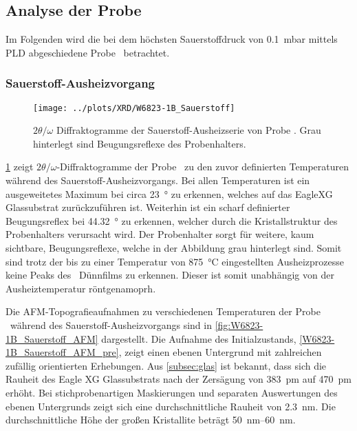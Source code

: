 
\newpage

\subsection{Analyse der Probe \samplethree}\label{subsec:probe-W6823-1}
Im Folgenden wird die bei dem höchsten Sauerstoffdruck von \qty{0.1}{\milli\bar} mittels PLD abgeschiedene Probe
\samplethree\ betrachtet.

\subsubsection{Sauerstoff-Aus\-heiz\-vor\-gang}\label{subsubsec:W6823-1B_Sauerstoff}
\begin{figure}
    \centering
    \texttt{[image: ../plots/XRD/W6823-1B\_Sauerstoff]}

    \caption{$2\theta/\omega$ Diffraktogramme der Sauerstoff-Ausheizserie von Probe \samplethree.
    Grau hinterlegt sind Beugungsreflexe des Probenhalters.}
    \label{fig:W6823-1B_Sauerstoff_XRD}
\end{figure}
\cref{fig:W6823-1B_Sauerstoff_XRD} zeigt $2\theta/\omega$-Diffraktogramme der Probe \samplethree\ zu den zuvor
definierten Temperaturen während des Sauerstoff-Aus\-heiz\-vor\-gangs.
Bei allen Temperaturen ist ein ausgeweitetes Maximum bei circa \qty{23}{\degree} zu erkennen, welches auf
das EagleXG Glassubstrat zurückzuführen ist.
Weiterhin ist ein scharf definierter Beugungsreflex bei \qty{44.32}{\degree} zu erkennen, welcher durch die
Kristallstruktur des Probenhalters verursacht wird.
Der Probenhalter sorgt für weitere, kaum sichtbare, Beugungsreflexe, welche in der Abbildung grau hinterlegt sind.
Somit sind trotz der bis zu einer Temperatur von \qty{875}{\degreeCelsius} eingestellten Ausheizprozesse keine Peaks
des \heo\ Dünnfilms zu erkennen.
Dieser ist somit unabhängig von der Ausheiztemperatur röntgenamoprh.

Die AFM-Topografieaufnahmen zu verschiedenen Temperaturen der Probe \samplethree\ während des Sauerstoff-Aus\-heiz\-vor\-gangs
sind in \cref{fig:W6823-1B_Sauerstoff_AFM} dargestellt.
Die Aufnahme des Initialzustands, \cref{W6823-1B_Sauerstoff_AFM_pre}, zeigt einen ebenen Untergrund mit zahlreichen
zufällig orientierten Erhebungen.
Aus \cref{subsec:glas} ist bekannt, dass sich die Rauheit des Eagle XG Glassubstrats nach der Zersägung von
\qty{383}{\pico\meter} auf \qty{470}{\pico\meter} erhöht.
Bei stichprobenartigen Maskierungen und separaten Auswertungen des ebenen Untergrunds zeigt sich eine durchschnittliche
Rauheit von \qty{2.3}{\nano\meter}.
Die durchschnittliche Höhe der großen Kristallite beträgt \qtyrange{50}{60}{\nano\meter}.

